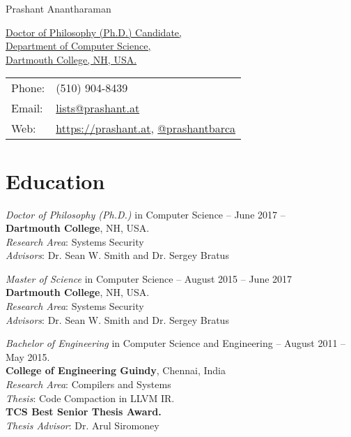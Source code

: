 \documentclass[letterpaper,10pt]{article}
\def\name{Prashant Anantharaman}
\renewenvironment{itemize}{
  \begin{list}{}{
    \setlength{\leftmargin}{1.5em}
  }
}{
  \end{list}
}
\begin{document}
{\huge \name}


\vspace{0.25in}

\begin{minipage}{0.55\linewidth}
    \href{}{Doctor of Philosophy (Ph.D.) Candidate,}\\
  \href{}{Department of Computer Science,}\\
  \href{}{Dartmouth College, NH, USA.}\\
\end{minipage}
\begin{minipage}{0.35\linewidth}
  \begin{tabular}{ll}
    Phone: & (510) 904-8439 \\
    Email: & \href{mailto:lists@prashant}{lists@prashant.at} \\
    Web: & \href{https://prashant.at}{https://prashant.at}, \href{http://www.twitter.com/prashantbarca/}{@prashantbarca} \\
  \end{tabular}
\end{minipage}

\section*{Education}
\begin{itemize}
\setlength\itemsep{0.5ex}
\item \textit{Doctor of Philosophy (Ph.D.)} in Computer Science --  June 2017 -- \\\textbf{Dartmouth College}, NH, USA.\\
    \textit{Research Area}: Systems Security\\
    \textit{Advisors}: Dr. Sean W. Smith and Dr. Sergey Bratus
\item \textit{Master of Science} in Computer Science -- August 2015 -- June 2017\\\textbf{Dartmouth College}, NH, USA.\\
    \textit{Research Area}: Systems Security\\
    \textit{Advisors}: Dr. Sean W. Smith and Dr. Sergey Bratus
\item \textit{Bachelor of Engineering} in Computer Science and Engineering -- August 2011 -- May 2015.\\ \textbf{College of Engineering Guindy}, Chennai, India\\
    \textit{Research Area}: Compilers and Systems\\
    \textit{Thesis}: Code Compaction in LLVM IR.\\
    \textbf{TCS Best Senior Thesis Award.}\\
    \textit{Thesis Advisor}: Dr. Arul Siromoney
\end{itemize}
\end{document}
